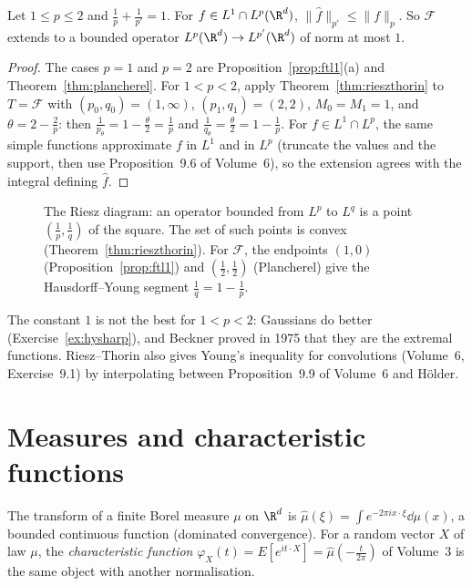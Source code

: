 \begin{corollary}\label{cor:hausdorffyoung}
Let $1\le p\le2$ and $\frac1p+\frac1{p'}=1$. For $f\in L^1\cap L^p(\R^d)$, $\|\hat f\|_{p'}\le\|f\|_p$. So $\mathcal F$ extends to a bounded operator $L^p(\R^d)\to L^{p'}(\R^d)$ of norm at most $1$.
\end{corollary}
\begin{proof}
The cases $p=1$ and $p=2$ are Proposition~\ref{prop:ftl1}(a) and Theorem~\ref{thm:plancherel}. For $1<p<2$, apply Theorem~\ref{thm:rieszthorin} to $T=\mathcal F$ with $(p_0,q_0)=(1,\infty)$, $(p_1,q_1)=(2,2)$, $M_0=M_1=1$, and
$\theta=2-\frac2p$: then $\frac1{p_\theta}=1-\frac\theta2=\frac1p$ and $\frac1{q_\theta}=\frac\theta2=1-\frac1p$. For $f\in L^1\cap L^p$, the same simple functions approximate $f$ in $L^1$ and in $L^p$ (truncate the values and the
support, then use Proposition~9.6 of Volume~6), so the extension agrees with the integral defining $\hat f$.
\end{proof}

\begin{figure}[ht]
\centering
{}
\caption{The Riesz diagram: an operator bounded from $L^p$ to $L^q$ is a point $(\frac1p,\frac1q)$ of the square. The set of such points is convex (Theorem~\ref{thm:rieszthorin}). For $\mathcal F$, the
endpoints $(1,0)$ (Proposition~\ref{prop:ftl1}) and $(\frac12,\frac12)$ (Plancherel) give the Hausdorff--Young segment $\frac1q=1-\frac1p$.}
\label{fig:riesz}
\end{figure}

The constant $1$ is not the best for $1<p<2$: Gaussians do better (Exercise~\ref{ex:hysharp}), and Beckner proved in 1975 that they are the extremal functions. Riesz--Thorin also gives Young's inequality for
convolutions (Volume~6, Exercise~9.1) by interpolating between Proposition~9.9 of Volume~6 and H\"older.

\section{Measures and characteristic functions}

The transform of a finite Borel measure $\mu$ on $\R^d$ is $\hat\mu(\xi)=\int e^{-2\pi ix\cdot\xi}\dd\mu(x)$, a bounded continuous function (dominated convergence). For a random vector $X$ of law $\mu$, the
\emph{characteristic function} $\varphi_X(t)=E[e^{it\cdot X}]=\hat\mu(-\frac t{2\pi})$ of Volume~3 is the same object with another normalisation.

